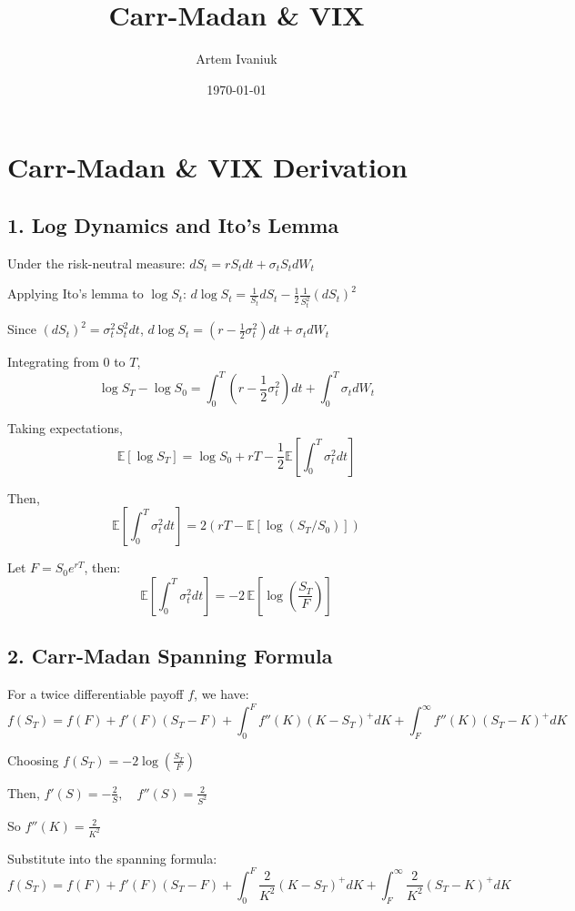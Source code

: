 \documentclass{article}
\title{Carr-Madan \& VIX}
\author{Artem Ivaniuk}
\date{\today}
\begin{document}
\maketitle

\section*{Carr-Madan \& VIX Derivation}

\subsection*{1. Log Dynamics and Ito's Lemma}

Under the risk-neutral measure:
$dS_t = r S_t dt + \sigma_t S_t dW_t$

Applying Ito's lemma to $\log S_t$:
$d\log S_t = \frac{1}{S_t} dS_t - \frac{1}{2}\frac{1}{S_t^2} (dS_t)^2$

Since $(dS_t)^2 = \sigma_t^2 S_t^2 dt$, 
$d\log S_t = \left(r - \frac{1}{2}\sigma_t^2\right) dt + \sigma_t dW_t$

Integrating from $0$ to $T$,
\[
\log S_T - \log S_0
= \int_0^T \left(r - \frac{1}{2}\sigma_t^2\right) dt
+ \int_0^T \sigma_t dW_t
\]

Taking expectations,
\[
\mathbb{E}[\log S_T]
= \log S_0 + rT - \frac{1}{2} \mathbb{E}\left[\int_0^T \sigma_t^2 dt\right]
\]

Then,
\[
\mathbb{E}\left[\int_0^T \sigma_t^2 dt\right]
= 2\left(rT - \mathbb{E}[\log(S_T/S_0)]\right)
\]

Let $F = S_0 e^{rT}$, then:
\[
\mathbb{E}\left[\int_0^T \sigma_t^2 dt\right]
= -2\,\mathbb{E}\left[\log\left(\frac{S_T}{F}\right)\right]
\]

\subsection*{2. Carr-Madan Spanning Formula}

For a twice differentiable payoff $f$, we have:
\[
f(S_T) = f(F) + f'(F)(S_T - F)
+ \int_0^F f''(K)(K - S_T)^+ dK
+ \int_F^\infty f''(K)(S_T - K)^+ dK
\]

Choosing
$f(S_T) = -2 \log\left(\frac{S_T}{F}\right)$

Then,
$f'(S) = -\frac{2}{S}, \quad f''(S) = \frac{2}{S^2}$

So $f''(K) = \frac{2}{K^2}$

Substitute into the spanning formula:
\[
f(S_T)
= f(F) + f'(F)(S_T - F)
+ \int_0^F \frac{2}{K^2}(K - S_T)^+ dK
+ \int_F^\infty \frac{2}{K^2}(S_T - K)^+ dK
\]
\end{document}
